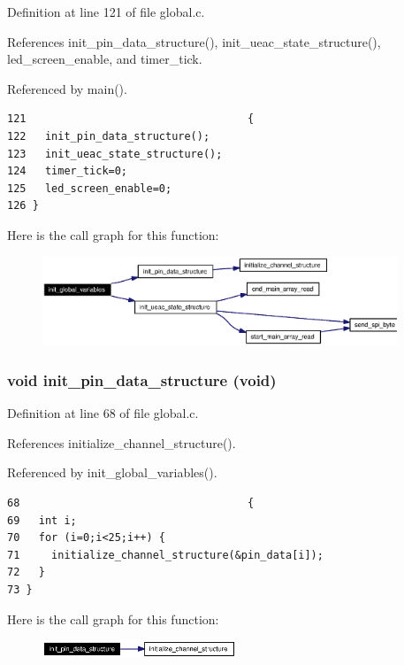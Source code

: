 Definition at line 121 of file global.c.

References init\_\-pin\_\-data\_\-structure(), init\_\-ueac\_\-state\_\-structure(), led\_\-screen\_\-enable, and timer\_\-tick.

Referenced by main().

\footnotesize\begin{verbatim}121                                   {
122   init_pin_data_structure();   
123   init_ueac_state_structure();
124   timer_tick=0;
125   led_screen_enable=0;
126 }
\end{verbatim}\normalsize 




Here is the call graph for this function:\begin{figure}[H]
\begin{center}
\leavevmode
\includegraphics[width=301pt]{global_8c_a10_cgraph}
\end{center}
\end{figure}
\subsubsection{\setlength{\rightskip}{0pt plus 5cm}void init\_\-pin\_\-data\_\-structure (void)}\label{global_8c_a8}




Definition at line 68 of file global.c.

References initialize\_\-channel\_\-structure().

Referenced by init\_\-global\_\-variables().

\footnotesize\begin{verbatim}68                                    {
69   int i;
70   for (i=0;i<25;i++) {
71     initialize_channel_structure(&pin_data[i]);
72   }
73 }
\end{verbatim}\normalsize 




Here is the call graph for this function:\begin{figure}[H]
\begin{center}
\leavevmode
\includegraphics[width=164pt]{global_8c_a8_cgraph}
\end{center}
\end{figure}
